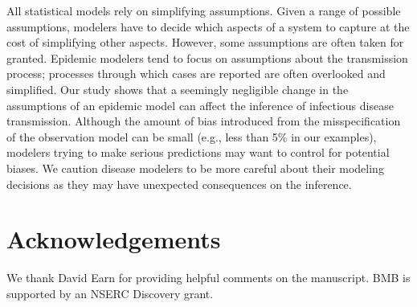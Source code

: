 \documentclass[12pt]{article}\usepackage[]{graphicx}\usepackage[]{color}
\begin{document}
All statistical models rely on simplifying assumptions.
Given a range of possible assumptions, modelers have to
decide which aspects of a system to capture 
at the cost of simplifying other aspects.
However, some assumptions are often taken for granted.
Epidemic modelers tend to focus on assumptions about the
transmission process; processes through which cases are reported are often 
overlooked and simplified.
Our study shows that a seemingly negligible change in the assumptions of an epidemic
model can affect the inference of 
infectious disease transmission.
Although the amount of bias introduced from the misspecification of the observation
model can be small (e.g., less than 5\% in our examples), modelers
trying to make serious predictions may want to control for potential biases.
We caution disease modelers to be more careful about their modeling decisions as they may have unexpected consequences on the inference.

\section*{Acknowledgements}

We thank David Earn for providing helpful comments on the manuscript. BMB is supported by an NSERC Discovery grant.


\end{document}
